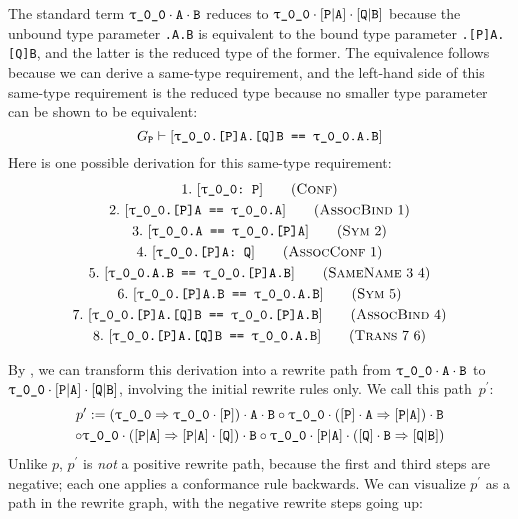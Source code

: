 \documentclass[../generics]{subfiles}
\begin{document}
\begin{example}
The standard term $\rT\cdot\nA\cdot\nB$ reduces to $\rT\cdot\aPA\cdot\assocsym{Q}{B}$ because the unbound type parameter \texttt{\rT.A.B} is equivalent to the bound type parameter \texttt{\rT.[P]A.[Q]B}, and the latter is the reduced type of the former. The equivalence follows because we can derive a same-type requirement, and the left-hand side of this same-type requirement is the reduced type because no smaller type parameter can be shown to be equivalent:
\[\GP\vdash\SameReq{\rT.[P]A.[Q]B}{\rT.A.B}\]
Here is one possible derivation for this same-type requirement:
\begin{gather*}
\ConfStep{\rT}{P}{1}\\
\AssocBindStep{1}{\rT.[P]A}{\rT.A}{2}\\
\SymStep{2}{\rT.A}{\rT.[P]A}{3}\\
\AssocConfStep{1}{\rT.[P]A}{Q}{4}\\
\SameNameStep{3}{4}{\rT.A.B}{\rT.[P]A.B}{5}\\
\SymStep{5}{\rT.[P]A.B}{\rT.A.B}{6}\\
\AssocBindStep{4}{\rT.[P]A.[Q]B}{\rT.[P]A.B}{7}\\
\TransStep{7}{6}{\rT.[P]A.[Q]B}{\rT.A.B}{8}
\end{gather*}

By , we can transform this derivation into a rewrite path from $\rT\cdot\nA\cdot\nB$ to $\rT\cdot\aPA\cdot\assocsym{Q}{B}$, involving the initial rewrite rules only. We call this path~$p^\prime$:
\begin{multline*}
p^\prime := (\ProtoConfInv{\rT}{P})\cdot\nA\cdot\nB \circ \rT\cdot(\AssocIntro{P}{A})\cdot\nB\\
\circ \rT\cdot(\ProtoConfInv{\aPA}{Q})\cdot\nB \circ \rT\cdot\aPA\cdot(\AssocIntro{Q}{B})
\end{multline*}
Unlike $p$, $p^\prime$ is \emph{not} a positive rewrite path, because the first and third steps are negative; each one applies a conformance rule backwards. We can visualize $p^\prime$ as a path in the rewrite graph, with the negative rewrite steps going up:
\begin{center}
\end{center}


\end{example}
\end{document}
